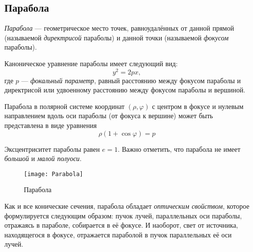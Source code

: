 \subsection{Парабола}

\textsl{Парабола} --- геометрическое место точек, равноудалённых от данной прямой (называемой \textit{директрисой} параболы) и данной точки (называемой \textit{фокусом} параболы).

Каноническое уравнение параболы имеет следующий вид:
\begin{equation}
y^2=2px,
\end{equation}
где $p$ --- \textit{фокальный параметр}, равный расстоянию между фокусом параболы и директрисой или удвоенному расстоянию между фокусом параболы и вершиной.

Парабола в полярной системе координат $(\rho,\varphi)$ с центром в фокусе и нулевым направлением вдоль оси параболы (от фокуса к вершине) может быть представлена в виде уравнения
\begin{equation}
\rho(1+\cos\varphi)=p
\end{equation}

Эксцентриситет параболы равен $e=1$.
Важно отметить, что парабола не имеет \textit{большой} и \textit{малой полуоси}.

\begin{figure}[h!]
\centering
\texttt{[image: Parabola]}
\caption{Парабола \label{pic:the-pic}}
\end{figure}

Как и все конические сечения, парабола обладает \textit{оптическим свойством}, которое формулируется следующим образом: пучок лучей, параллельных оси параболы, отражаясь в параболе, собирается в её фокусе. И наоборот, свет от источника, находящегося в фокусе, отражается параболой в пучок параллельных её оси лучей.

